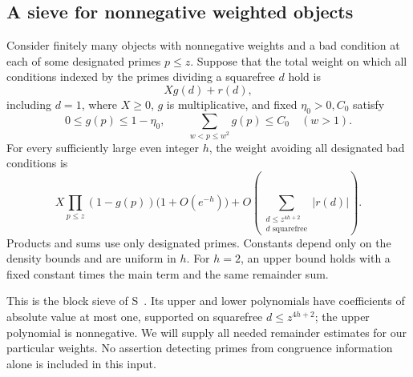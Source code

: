 \subsection{A sieve for nonnegative weighted objects}

\begin{lemma}\label{lem:block-sieve}
Consider finitely many objects with nonnegative weights and a bad
condition at each of some designated primes $p\le z$.  Suppose
that the total weight on which all conditions indexed by the primes
dividing a squarefree $d$ hold is
\[
 Xg(d)+r(d),
\]
including $d=1$, where $X\ge0$, $g$ is multiplicative, and fixed
$\eta_0>0,C_0$ satisfy
\[
 0\le g(p)\le1-\eta_0,
 \qquad \sum_{w<p\le w^2}g(p)\le C_0\quad(w>1).
\]
For every sufficiently large even integer $h$, the weight avoiding
all designated bad conditions is
\begin{equation}\label{eq:block-sieve}
 X\prod_{p\le z}(1-g(p))\bigl(1+O(e^{-h})\bigr)
 +O\!\left(\sum_{\substack{d\le z^{4h+2}\\d\text{ squarefree}}}
          |r(d)|\right).
\end{equation}
Products and sums use only designated primes.  Constants depend
only on the density bounds and are uniform in $h$.  For $h=2$,
an upper bound holds with a fixed constant times the main term
and the same remainder sum.
\end{lemma}

This is the block sieve of S~\cite[Lemma~2.9]{SmoothShifted}.
Its upper and lower polynomials have coefficients of absolute value
at most one, supported on squarefree $d\le z^{4h+2}$; the upper
polynomial is nonnegative.  We will supply all needed remainder
estimates for our particular weights.  No assertion detecting
primes from congruence information alone is included in this input.
